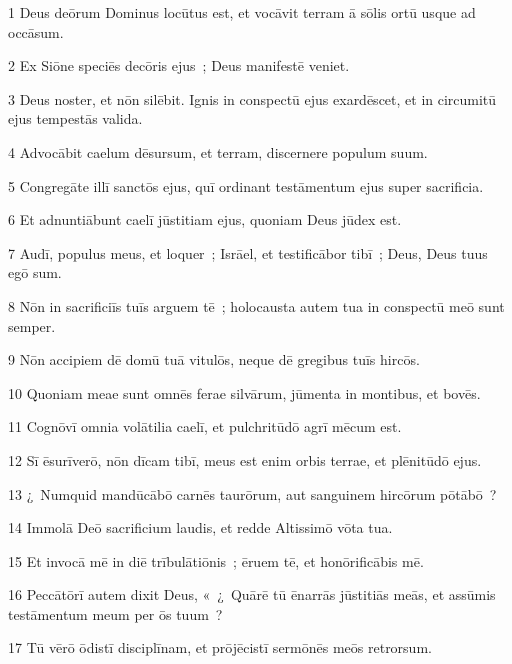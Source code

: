 

\psalmVerse
  {\phantom{00}1}
  {Deus deōrum Dominus locūtus est, et vocāvit terram ā sōlis ortū usque ad occāsum.}


\psalmVerse
  {\phantom{00}2}
  {Ex Siōne speciēs decōris ejus~; Deus manifestē veniet.}


\psalmVerse
  {\phantom{00}3}
  {Deus noster, et nōn silēbit. Ignis in conspectū ejus exardēscet, et in circumitū ejus tempestās valida.}


\psalmVerse
  {\phantom{00}4}
  {Advocābit caelum dēsursum, et terram, discernere populum suum.}


\psalmVerse
  {\phantom{00}5}
  {Congregāte illī sanctōs ejus, quī ordinant testāmentum ejus super sacrificia.}


\psalmVerse
  {\phantom{00}6}
  {Et adnuntiābunt caelī jūstitiam ejus, quoniam Deus jūdex est.}


\psalmVerse
  {\phantom{00}7}
  {Audī, populus meus, et loquer~; Isrāel, et testificābor tibī~; Deus, Deus tuus egō sum.}


\psalmVerse
  {\phantom{00}8}
  {Nōn in sacrificiīs tuīs arguem tē~; holocausta autem tua in conspectū meō sunt semper.}


\psalmVerse
  {\phantom{00}9}
  {Nōn accipiem dē domū tuā vitulōs, neque dē gregibus tuīs hircōs.}


\psalmVerse
  {\phantom{0}10}
  {Quoniam meae sunt omnēs ferae silvārum, jūmenta in montibus, et bovēs.}


\psalmVerse
  {\phantom{0}11}
  {Cognōvī omnia volātilia caelī, et pulchritūdō agrī mēcum est.}


\psalmVerse
  {\phantom{0}12}
  {Sī ēsurīverō, nōn dīcam tibī, meus est enim orbis terrae, et plēnitūdō ejus.}


\psalmVerse
  {\phantom{0}13}
  {¿~Numquid mandūcābō carnēs taurōrum, aut sanguinem hircōrum pōtābō~?}


\psalmVerse
  {\phantom{0}14}
  {Immolā Deō sacrificium laudis, et redde Altissimō vōta tua.}


\psalmVerse
  {\phantom{0}15}
  {Et invocā mē in diē trībulātiōnis~; ēruem tē, et honōrificābis mē.}


\psalmVerse
  {\phantom{0}16}
  {Peccātōrī autem dixit Deus, «~¿~Quārē tū ēnarrās jūstitiās meās, et assūmis testāmentum meum per ōs tuum~?}


\psalmVerse
  {\phantom{0}17}
  {Tū vērō ōdistī disciplīnam, et prōjēcistī sermōnēs meōs retrorsum.}


